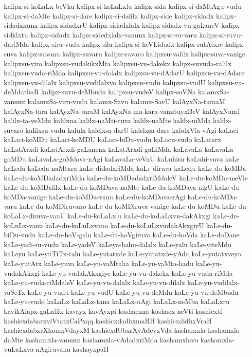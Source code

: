 {kalipx-si-koLaLx-beVku
kalipx-si-koLaLxlu
kalipx-sida
kalipx-si-daMtAgu-vudu
kalipx-si-daMte
kalipx-si-dare
kalipx-si-dalilx
kalipx-side
kalipx-sidadx
kalipx-sidadxnunx
kalipx-sidadxrU
kalipx-sidadxlalx
kalipx-sidadx-vu-gaLaneV
kalipx-sididxtu
kalipx-sidudx
kalipx-sidedxlalx-vanunx
kalipx-si-ru-varu
kalipx-si-ruvu-dariMda
kalipx-siru-vudu
kalipx-silu
kalipx-si-heVLidudx
kalipx-sutAtxre
kalipx-suva
kalipx-suvanu
kalipx-suvaru
kalipx-suvaro
kalipxsu-valilx
kalipx-suva-vanige
kalipxsu-viro
kalipxsu-vudakikxMta
kalipxsu-vu-dakekx
kalipx-suvuda-ralilx
kalipxsu-vuda-riMda
kalipxsu-vu-dalalx
kalipxsu-vu-dAdarU
kalipxsu-vu-dAdare
kalipxsu-vu-dilalx
kalipxsu-vudilalxvo
kalipxsu-vudu
kalipxsu-vudU
kalipxsu-vu-deMdathaR
kalipx-suvu-deMbudu
kalipxsu-vudeV
kalipx-soVNa
kalamxSa-vanunx
kalamxSa-viru-vudu
kalamx-Savu
kalamx-SavU
kalAyxNa-tamaM
kalAyxNa-tara
kalAyxNa-taraM
kalAyxNa-ma-kara-vamituyxBeV
kalAyxNamf
kalilx-ta-veMdu
kalilxna
kalilx-naMti-ruva
kalilx-naMte
kalilx-niMda
kalilx-suvaro
kalilxsu-vudu
kalulx
kalelxsa-darU
kalelxsa-dare
kalolxVla-vAgi
kaLaci
kaLaci-koMDu
kaLaci-koMDU
kaLaci-biDu-vudu
kaLacu-vudo
kaLatarx
kaLatArxdi
kaLatArxdi-gaLanenx
kaLatArxdi-gaLiMda
kaLavaLa
kaLavaLa-goMDu
kaLavaLa-goMdava-nAgi
kaLavaLa-veVnU
kaLuhisu
kaLuhi-suva
kaLe
kaLeda
kaLeda-naMtara
kaLe-didadxriMda
kaLe-diruva
kaLedu
kaLe-du-koMDa
kaLe-du-koMDadadxriMda
kaLe-du-koMDadadxriMdaleV
kaLe-du-koMDa-meVle
kaLe-du-koMDalilx
kaLe-du-koMDava-naMte
kaLe-du-koMDava-nigU
kaLe-du-koMDa-vanige
kaLe-du-koMDa-vanu
kaLe-du-koMDava-rAgi
kaLe-du-koMDa-varu
kaLe-du-koMDiruvano
kaLe-du-koMDiruva-vanige
kaLe-du-koMDu
kaLe-du-koLaLx-diruva-vanU
kaLe-du-koLaLxlu
kaLe-du-koLaLxvu-dakAkxgi
kaLe-du-koLuLx-vanu
kaLe-du-koLuLxvano
kaLe-du-koLuLxvudakAkxgiyU
kaLe-du-biDu-vudu
kaLe-du-hoV-galu
kaLe-du-hoVgiruva
kaLe-du-hoVda
kaLe-doDane
kaLe-yadi-ru-vudu
kaLe-yadeV
kaLeya-bahu-dalalx
kaLe-yalu
kaLe-yiteMdu
kaLeyu
kaLe-yuTiTx-ralu
kaLe-yutatxde
kaLe-yutatxde-yAda
kaLe-yutatxveyo
kaLe-yutAtx
kaLe-yuva
kaLe-yu-vaMtaha
kaLe-yu-vaMta-hadu
kaLe-yu-vudakAkxgi
kaLe-yu-vudakAkxgiye
kaLe-yu-vu-dakekx
kaLe-yu-vuda-riMda
kaLe-yu-vuda-riMdaleV
kaLe-yu-vu-dalalx
kaLe-yu-vu-dilalx
kaLe-yu-vudilalx-vaSeTx
kaLe-yu-vudu
kaLe-yu-vudU
kaLe-yu-vu-deMdu
kaLe-yu-vu-deMbudu
kaLe-yu-vudo
kaLaLx
kaLaLx-tana
kaLaLx-nAgi
kaLaLx-neMba
kaLaLxru
kavikAlapx-gaLalilx
kavayx
kavAyxpi
kashacxna
kashacx-neVti
kashicxtf
kashicxdabarxviVtatxCaPxqq
kashicxdadhxmaRH
kashicxdidhxVraH
kashicxdabxrXhomxVdayxM
kashicxdUbxrXyAdevxVda
kashamxla
kashamxla-daMte
kashamxla-vanunx
kashamxla-vAdadxriMda
kashamxlavu
kashamxla-vuLaLxva-nAgiruvanu
kashayxpaH
}
